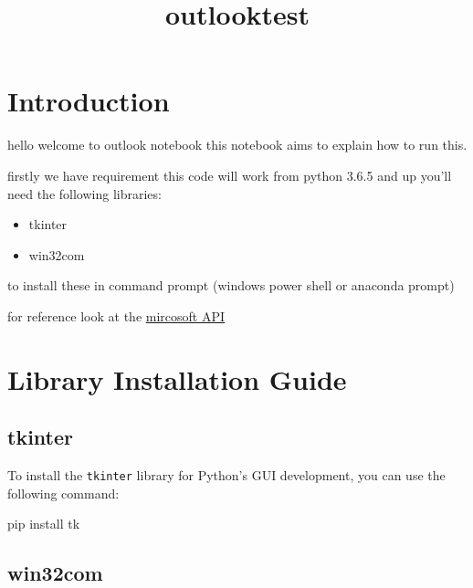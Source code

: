 \documentclass[11pt]{article}
\title{outlooktest}
\providecommand{\tightlist}{%
      \setlength{\itemsep}{0pt}\setlength{\parskip}{0pt}}
\newenvironment{Shaded}{}{}
\newcommand{\NormalTok}[1]{{#1}}
\newcommand{\ExtensionTok}[1]{{#1}}
\begin{document}
    
    
    \maketitle
    
    

    
    \section{Introduction}\label{introduction}

hello welcome to outlook notebook this notebook aims to explain how to
run this.

    firstly we have requirement this code will work from python 3.6.5 and up
you'll need the following libraries:

\begin{itemize}
\tightlist
\item
  tkinter
\item
  win32com
\end{itemize}

to install these in command prompt (windows power shell or anaconda
prompt)

for reference look at the
\href{https://learn.microsoft.com/en-us/graph/api/resources/mail-api-overview?view=graph-rest-1.0\&preserve-view=true}{mircosoft
API}

\section{Library Installation Guide}\label{library-installation-guide}

\subsection{tkinter}\label{tkinter}

To install the \texttt{tkinter} library for Python's GUI development,
you can use the following command:

\begin{Shaded}
\begin{Highlighting}[]
\ExtensionTok{pip}\NormalTok{ install tk}
\end{Highlighting}
\end{Shaded}

\subsection{win32com}\label{win32com}
\end{document}
